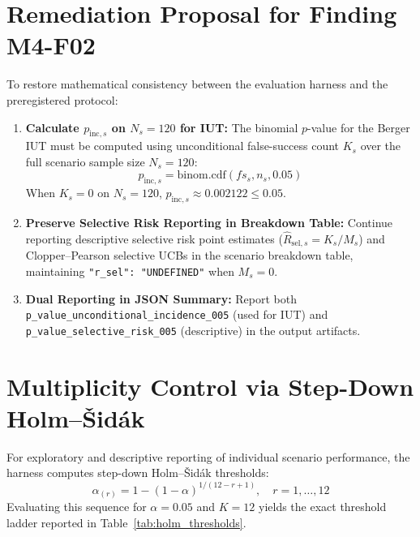 \documentclass[10pt,a4paper]{article}
\begin{document}
\section{Remediation Proposal for Finding M4-F02}
To restore mathematical consistency between the evaluation harness and the preregistered protocol:
\begin{enumerate}
    \item \textbf{Calculate $p_{\mathrm{inc}, s}$ on $N_s = 120$ for IUT:} The binomial $p$-value for the Berger IUT must be computed using unconditional false-success count $K_s$ over the full scenario sample size $N_s = 120$:
    \begin{equation}
    p_{\mathrm{inc}, s} = \mathrm{binom.cdf}(fs_s, n_s, 0.05)
    \end{equation}
    When $K_s = 0$ on $N_s = 120$, $p_{\mathrm{inc}, s} \approx 0.002122 \le 0.05$.
    \item \textbf{Preserve Selective Risk Reporting in Breakdown Table:} Continue reporting descriptive selective risk point estimates ($\hat{R}_{\mathrm{sel}, s} = K_s / M_s$) and Clopper--Pearson selective UCBs in the scenario breakdown table, maintaining \texttt{"r\_sel": "UNDEFINED"} when $M_s = 0$.
    \item \textbf{Dual Reporting in JSON Summary:} Report both \texttt{p\_value\_unconditional\_incidence\_005} (used for IUT) and \texttt{p\_value\_selective\_risk\_005} (descriptive) in the output artifacts.
\end{enumerate}

\section{Multiplicity Control via Step-Down Holm--Šidák}
For exploratory and descriptive reporting of individual scenario performance, the harness computes step-down Holm--Šidák thresholds:
\begin{equation}
\alpha_{(r)} = 1 - (1 - \alpha)^{1 / (12 - r + 1)}, \quad r = 1, \dots, 12
\end{equation}
Evaluating this sequence for $\alpha = 0.05$ and $K = 12$ yields the exact threshold ladder reported in Table~\ref{tab:holm_thresholds}.
\end{document}
